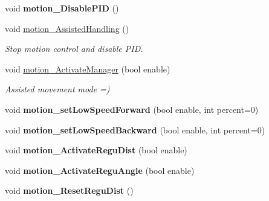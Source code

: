 \begin{DoxyCompactItemize}
\item 
\mbox{\label{classAsservDriver_a0a68a702d1fea277c2e24e6dceb2d646}} 
void {\bfseries motion\+\_\+\+Disable\+P\+ID} ()
\item 
\mbox{\label{classAsservDriver_a733d0cddfdb612cea9e8097b348537f1}} 
void \hyperlink{classAsservDriver_a733d0cddfdb612cea9e8097b348537f1}{motion\+\_\+\+Assisted\+Handling} ()
\begin{DoxyCompactList}\small\item\em Stop motion control and disable P\+ID. \end{DoxyCompactList}\item 
\mbox{\label{classAsservDriver_aaeb3c80c8a079c812af38273f825c537}} 
void \hyperlink{classAsservDriver_aaeb3c80c8a079c812af38273f825c537}{motion\+\_\+\+Activate\+Manager} (bool enable)
\begin{DoxyCompactList}\small\item\em Assisted movement mode =) \end{DoxyCompactList}\item 
\mbox{\label{classAsservDriver_a179a024ddd900587e4da74521f9b7f1a}} 
void {\bfseries motion\+\_\+set\+Low\+Speed\+Forward} (bool enable, int percent=0)
\item 
\mbox{\label{classAsservDriver_a713b553740e59136151e2c6886187713}} 
void {\bfseries motion\+\_\+set\+Low\+Speed\+Backward} (bool enable, int percent=0)
\item 
\mbox{\label{classAsservDriver_a48e4f69bf857d6a18098dc48615a61f1}} 
void {\bfseries motion\+\_\+\+Activate\+Regu\+Dist} (bool enable)
\item 
\mbox{\label{classAsservDriver_a846608b8033f7d592d2540b68de72eeb}} 
void {\bfseries motion\+\_\+\+Activate\+Regu\+Angle} (bool enable)
\item 
\mbox{\label{classAsservDriver_acb84d282c7e0b40d9b326b0fcb7a0c69}} 
void {\bfseries motion\+\_\+\+Reset\+Regu\+Dist} ()
\item 
\mbox{\label{classAsservDriver_acd102376cacdf0fc40a587f25359a25e}} 

\end{DoxyCompactItemize}
